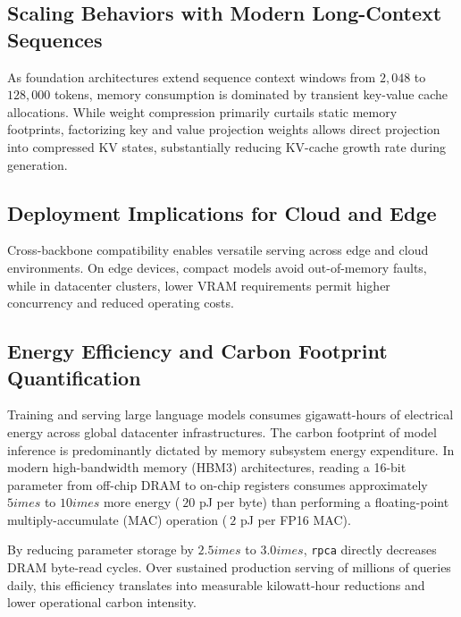 \subsection{Scaling Behaviors with Modern Long-Context Sequences}
As foundation architectures extend sequence context windows from $2{,}048$ to $128{,}000$ tokens, memory consumption is dominated by transient key-value cache allocations. While weight compression primarily curtails static memory footprints, factorizing key and value projection weights allows direct projection into compressed KV states, substantially reducing KV-cache growth rate during generation.

\subsection{Deployment Implications for Cloud and Edge}
Cross-backbone compatibility enables versatile serving across edge and cloud environments. On edge devices, compact models avoid out-of-memory faults, while in datacenter clusters, lower VRAM requirements permit higher concurrency and reduced operating costs.

\subsection{Energy Efficiency and Carbon Footprint Quantification}
Training and serving large language models consumes gigawatt-hours of electrical energy across global datacenter infrastructures. The carbon footprint of model inference is predominantly dictated by memory subsystem energy expenditure. In modern high-bandwidth memory (HBM3) architectures, reading a 16-bit parameter from off-chip DRAM to on-chip registers consumes approximately $5	imes$ to $10	imes$ more energy ($~20$ pJ per byte) than performing a floating-point multiply-accumulate (MAC) operation ($~2$ pJ per FP16 MAC).

By reducing parameter storage by $2.5	imes$ to $3.0	imes$, \texttt{rpca} directly decreases DRAM byte-read cycles. Over sustained production serving of millions of queries daily, this efficiency translates into measurable kilowatt-hour reductions and lower operational carbon intensity.
